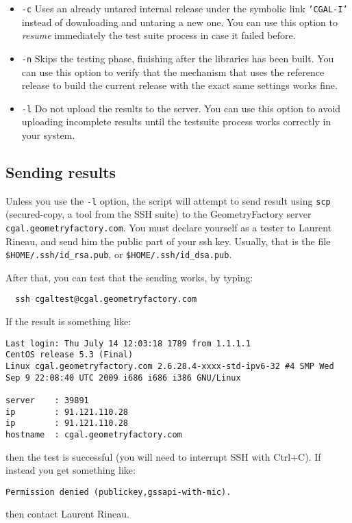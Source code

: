 \begin{itemize}
   \item {\tt -c} Uses an already untared internal release under the
                  symbolic link {\tt 'CGAL-I'} instead of
                  downloading and untaring a new one. You can use this option
                  to {\em resume} immediately the test suite process in case it
                  failed before.

   \item {\tt -n} Skips the testing phase, finishing after the libraries has been built.
                  You can use this option to verify that the mechanism that uses the
                  reference release to build the current release with the exact same
                  settings works fine.

   \item {\tt -l} Do not upload the results to the server.
                  You can use this option to avoid uploading incomplete results until
                  the testsuite process works correctly in your system.
\end{itemize}

\subsection{Sending results}
Unless you use the {\tt -l} option, the script will attempt to send result
using {\tt scp} (secured-copy, a tool from the SSH suite) to the
GeometryFactory server {\tt cgal.geometryfactory.com}. You must declare
yourself as a tester to Laurent Rineau, and send him the public part of
your ssh key. Usually, that is the file {\tt \$HOME/.ssh/id\_rsa.pub}, or
{\tt \$HOME/.ssh/id\_dsa.pub}.

After that, you can test that the sending works, by typing:
\begin{verbatim}
  ssh cgaltest@cgal.geometryfactory.com
\end{verbatim}
If the result is something like:
\begin{verbatim}
Last login: Thu July 14 12:03:18 1789 from 1.1.1.1
CentOS release 5.3 (Final)
Linux cgal.geometryfactory.com 2.6.28.4-xxxx-std-ipv6-32 #4 SMP Wed Sep 9 22:08:40 UTC 2009 i686 i686 i386 GNU/Linux

server    : 39891
ip        : 91.121.110.28
ip        : 91.121.110.28
hostname  : cgal.geometryfactory.com
\end{verbatim}
then the test is successful (you will need to interrupt SSH with
Ctrl+C). If instead you get something like:
\begin{verbatim}
Permission denied (publickey,gssapi-with-mic).
\end{verbatim}
then contact Laurent Rineau.

